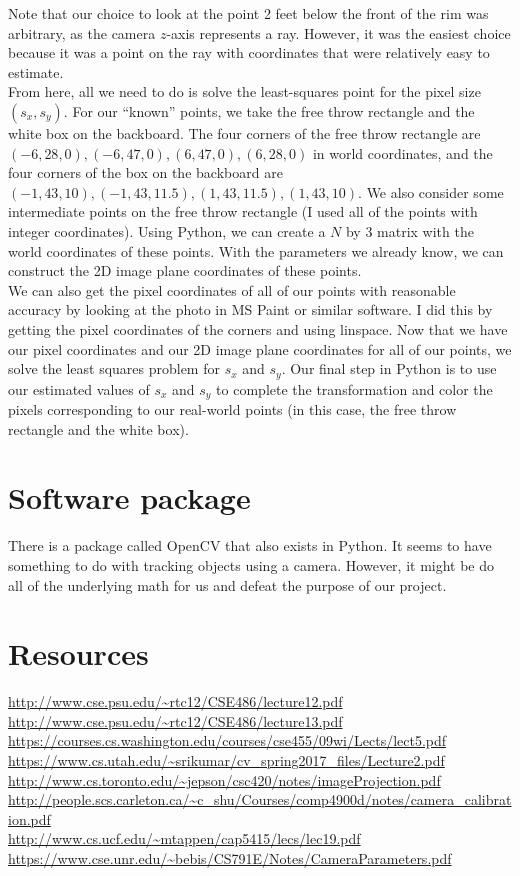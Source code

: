 \documentclass{article}
\begin{document}
Note that our choice to look at the point 2 feet below the front of the rim was arbitrary, as the camera $z$-axis represents a ray. However, it was the easiest choice because it was a point on the ray with coordinates that were relatively easy to estimate. \\

From here, all we need to do is solve the least-squares point for the pixel size $(s_x, s_y)$. For our ``known'' points, we take the free throw rectangle and the white box on the backboard. The four corners of the free throw rectangle are $(-6, 28, 0), (-6, 47, 0), (6, 47, 0), (6, 28, 0)$ in world coordinates, and the four corners of the box on the backboard are $(-1, 43, 10), (-1, 43, 11.5), (1, 43, 11.5), (1, 43, 10)$. We also consider some intermediate points on the free throw rectangle (I used all of the points with integer coordinates). Using Python, we can create a $N$ by 3 matrix with the world coordinates of these points. With the parameters we already know, we can construct the 2D image plane coordinates of these points. \\

We can also get the pixel coordinates of all of our points with reasonable accuracy by looking at the photo in MS Paint or similar software. I did this by getting the pixel coordinates of the corners and using linspace. Now that we have our pixel coordinates and our 2D image plane coordinates for all of our points, we solve the least squares problem for $s_x$ and $s_y$. Our final step in Python is to use our estimated values of $s_x$ and $s_y$ to complete the transformation and color the pixels corresponding to our real-world points (in this case, the free throw rectangle and the white box).

\section{Software package}
There is a package called OpenCV that also exists in Python. It seems to have something to do with tracking objects using a camera. However, it might be do all of the underlying math for us and defeat the purpose of our project.

\bigskip
\section{Resources}
\url{http://www.cse.psu.edu/~rtc12/CSE486/lecture12.pdf} \\
\url{http://www.cse.psu.edu/~rtc12/CSE486/lecture13.pdf} \\
\url{https://courses.cs.washington.edu/courses/cse455/09wi/Lects/lect5.pdf} \\
\url{https://www.cs.utah.edu/~srikumar/cv_spring2017_files/Lecture2.pdf} \\
\url{http://www.cs.toronto.edu/~jepson/csc420/notes/imageProjection.pdf} \\
\url{http://people.scs.carleton.ca/~c_shu/Courses/comp4900d/notes/camera_calibration.pdf} \\
\url{http://www.cs.ucf.edu/~mtappen/cap5415/lecs/lec19.pdf} \\
\url{https://www.cse.unr.edu/~bebis/CS791E/Notes/CameraParameters.pdf} \\
\end{document}
